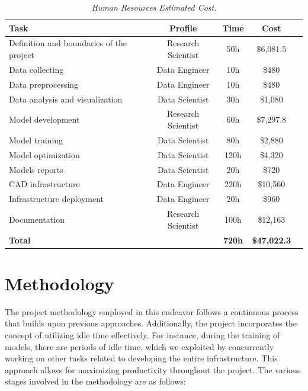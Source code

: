 \newpage

\begin{table}[H]
  \centering
  \begin{tabular}{lcccc}
    \toprule
    \textbf{Task} & \textbf{Profile} & \textbf{Time} & \textbf{Cost} \\
    \midrule
    Definition and boundaries of the project & Research Scientist & 50h & \$6,081.5\\
    Data collecting & Data Engineer & 10h & \$480\\
    Data preprocessing & Data Engineer & 10h & \$480 \\
    Data analysis and visualization & Data Scientist & 30h & \$1,080\\
    Model development & Research Scientist & 60h & \$7,297.8 \\
    Model training & Data Scientist & 80h & \$2,880 \\
    Model optimization & Data Scientist & 120h & \$4,320 \\
    Models reports & Data Scientist & 20h & \$720 \\
    CAD infrastructure & Data Engineer & 220h & \$10,560 \\
    Infrastructure deployment & Data Engineer & 20h & \$960 \\
    Documentation & Research Scientist & 100h & \$12,163 \\
    \midrule
    \textbf{Total} &    &  \textbf{720h} & \textbf{\$47,022.3} \\
    \bottomrule
  \end{tabular}
  \caption[Human Resources Estimated Cost.]
  {\textit{Human Resources Estimated Cost. }}
  {\label{table:human_resources_cost}}
\end{table}


\section{Methodology}

The project methodology employed in this endeavor follows a continuous process
that builds upon previous approaches. Additionally, the project incorporates
the concept of utilizing idle time effectively. For instance, during the
training of models, there are periods of idle time, which we exploited by
concurrently working on other tasks related to developing the entire
infrastructure. This approach allows for maximizing productivity throughout the
project. The various stages involved in the methodology are as follows: \\

